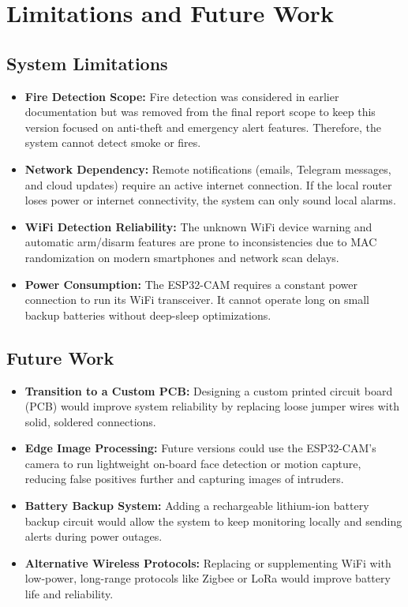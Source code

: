 \documentclass[11pt,a4paper]{report}
\begin{document}
\chapter{Limitations and Future Work}
\section{System Limitations}
\begin{itemize}
    \item \textbf{Fire Detection Scope:} Fire detection was considered in earlier documentation but was removed from the final report scope to keep this version focused on anti-theft and emergency alert features. Therefore, the system cannot detect smoke or fires.
    \item \textbf{Network Dependency:} Remote notifications (emails, Telegram messages, and cloud updates) require an active internet connection. If the local router loses power or internet connectivity, the system can only sound local alarms.
    \item \textbf{WiFi Detection Reliability:} The unknown WiFi device warning and automatic arm/disarm features are prone to inconsistencies due to MAC randomization on modern smartphones and network scan delays.
    \item \textbf{Power Consumption:} The ESP32-CAM requires a constant power connection to run its WiFi transceiver. It cannot operate long on small backup batteries without deep-sleep optimizations.
\end{itemize}
\section{Future Work}
\begin{itemize}
    \item \textbf{Transition to a Custom PCB:} Designing a custom printed circuit board (PCB) would improve system reliability by replacing loose jumper wires with solid, soldered connections.
    \item \textbf{Edge Image Processing:} Future versions could use the ESP32-CAM's camera to run lightweight on-board face detection or motion capture, reducing false positives further and capturing images of intruders.
    \item \textbf{Battery Backup System:} Adding a rechargeable lithium-ion battery backup circuit would allow the system to keep monitoring locally and sending alerts during power outages.
    \item \textbf{Alternative Wireless Protocols:} Replacing or supplementing WiFi with low-power, long-range protocols like Zigbee or LoRa would improve battery life and reliability.
\end{itemize}
\end{document}

